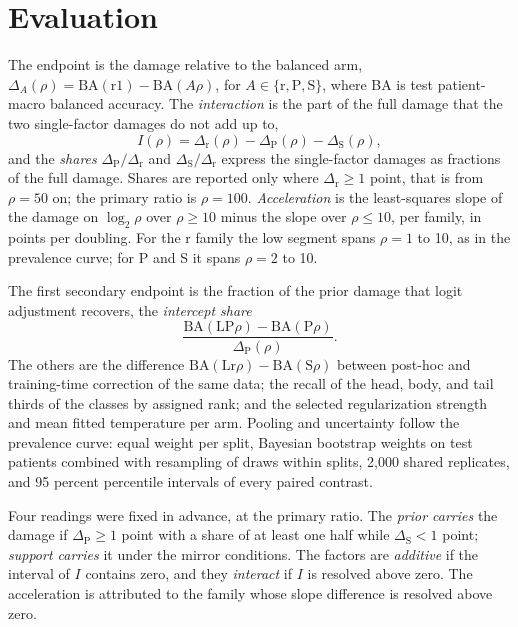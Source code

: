 \documentclass[11pt]{article}
\begin{document}
\section{Evaluation}
\label{sec:evaluation}
The endpoint is the damage relative to the balanced arm, $\Delta_A(\rho)=\mathrm{BA}(\text{r1})-\mathrm{BA}(A\rho)$, for $A\in\{\text{r},\text{P},\text{S}\}$, where BA is test patient-macro balanced accuracy. The \emph{interaction} is the part of the full damage that the two single-factor damages do not add up to,
\begin{equation}
  I(\rho) = \Delta_\text{r}(\rho) - \Delta_\text{P}(\rho) - \Delta_\text{S}(\rho),
  \label{eq:interaction}
\end{equation}
\noindent and the \emph{shares} $\Delta_\text{P}/\Delta_\text{r}$ and $\Delta_\text{S}/\Delta_\text{r}$ express the single-factor damages as fractions of the full damage. Shares are reported only where $\Delta_\text{r}\geq1$ point, that is from $\rho=50$ on; the primary ratio is $\rho=100$. \emph{Acceleration} is the least-squares slope of the damage on $\log_2\rho$ over $\rho\geq10$ minus the slope over $\rho\leq10$, per family, in points per doubling. For the r family the low segment spans $\rho=1$ to 10, as in the prevalence curve; for P and S it spans $\rho=2$ to 10.

The first secondary endpoint is the fraction of the prior damage that logit adjustment recovers, the \emph{intercept share}
\begin{equation}
  \frac{\mathrm{BA}(\text{LP}\rho)-\mathrm{BA}(\text{P}\rho)}{\Delta_\text{P}(\rho)}.
  \label{eq:intercept-share}
\end{equation}
\noindent The others are the difference $\mathrm{BA}(\text{Lr}\rho)-\mathrm{BA}(\text{S}\rho)$ between post-hoc and training-time correction of the same data; the recall of the head, body, and tail thirds of the classes by assigned rank; and the selected regularization strength and mean fitted temperature per arm. Pooling and uncertainty follow the prevalence curve: equal weight per split, Bayesian bootstrap weights on test patients \citep{rubin1981bayesian} combined with resampling of draws within splits, 2,000 shared replicates, and 95 percent percentile intervals of every paired contrast.

Four readings were fixed in advance, at the primary ratio. The \emph{prior carries} the damage if $\Delta_\text{P}\geq1$ point with a share of at least one half while $\Delta_\text{S}<1$ point; \emph{support carries} it under the mirror conditions. The factors are \emph{additive} if the interval of $I$ contains zero, and they \emph{interact} if $I$ is resolved above zero. The acceleration is attributed to the family whose slope difference is resolved above zero.





\end{document}

